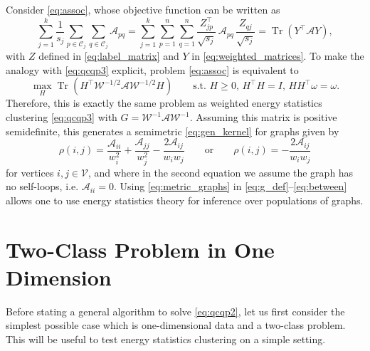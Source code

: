 \documentclass[aps,preprint,nofootinbib,floatfix]{revtex4-1}
\DeclareMathOperator{\Tr}{Tr}
\newcommand\C{{\mathcal{C}}}
\newcommand\om{\omega}
\begin{document}
Consider \eqref{eq:assoc}, whose objective function can be written as
\begin{equation}
\sum_{j=1}^k \dfrac{1}{s_j} \sum_{p \in \C_j} \sum_{q \in \C_j}
\mathcal{A}_{pq} = \sum_{j=1}^k \sum_{p=1}^n \sum_{q=1}^n 
\dfrac{Z^\top_{jp}}{\sqrt{s_j}} \, \mathcal{A}_{pq} \, 
\dfrac{Z_{qj}}{\sqrt{s_j}}
= \Tr\left( Y^\top \mathcal{A} Y \right) ,
\end{equation}
with $Z$ defined in \eqref{eq:label_matrix} and $Y$ in
\eqref{eq:weighted_matrices}. To make the analogy with \eqref{eq:qcqp3}
explicit,  problem \eqref{eq:assoc} is equivalent to
\begin{equation}
\max_H \Tr\left( H^\top \mathcal{W}^{-1/2} \mathcal{A} \mathcal{W}^{-1/2} H 
\right) \qquad \mbox{s.t. $H\ge 0$, $H^\top H = I$, $H H^\top
\om=\om$}.
\end{equation}
Therefore, this is exactly the same problem as weighted energy statistics
clustering \eqref{eq:qcqp3} with 
$G = \mathcal{W}^{-1} \mathcal{A} \mathcal{W}^{-1}$. Assuming this
matrix is positive semidefinite, this generates a semimetric
\eqref{eq:gen_kernel} for graphs given by
\begin{equation}
\label{eq:metric_graphs}
\rho(i,j) = 
\dfrac{\mathcal{A}_{ii}}{w_i^{2}}
+\dfrac{\mathcal{A}_{jj}}{w_j^{2}}
-\dfrac{2 \mathcal{A}_{ij}}{w_i w_j} \qquad\mbox{or}\qquad
\rho(i,j) = -\dfrac{2 \mathcal{A}_{ij}}{w_i w_j}
\end{equation}
for vertices $i,j \in \mathcal{V}$, and 
where in the second equation we assume the graph has no self-loops,
i.e. $\mathcal{A}_{ii} = 0$. Using \eqref{eq:metric_graphs} 
in \eqref{eq:g_def}--\eqref{eq:between}
allows one to use energy statistics theory for inference
over populations of graphs.


\section{Two-Class Problem in One Dimension}
\label{sec:twoclass}

Before stating a general algorithm to solve \eqref{eq:qcqp2}, 
let us first consider the simplest possible case which
is one-dimensional data and a two-class problem. This will be useful to test
energy statistics clustering on a simple setting.
\end{document}
